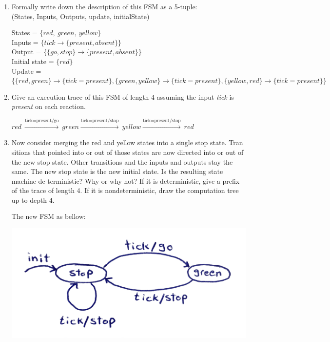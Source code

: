 \documentclass[12pt]{article}
\begin{document}
\begin{enumerate}
	\item Formally write down the description of this FSM as a 5-tuple:\\
	\centering(States, Inputs, Outputs, update, initialState)
	
	\begin{qsolve}[Solution]
		\raggedright States = $\{red,\ green,\ yellow\}$ \\
		Inputs = $\{ tick \rightarrow \{present, absent \} \}$ \\
		Output = $\{\{go, stop\} \rightarrow \{present, absent\} \}$ \\
		Initial state = $\{red\}$\\
		Update = $\{\{red,green\}\rightarrow \{tick=present\}, \{green,yellow\}\rightarrow \{tick=present\}, \{yellow,red\}\rightarrow \{tick=present\} \}$
	\end{qsolve}
	
	
	\item \raggedright Give an execution trace of this FSM of length 4 assuming the input \textit{tick} is
	\textit{present} on each reaction.
	\begin{qsolve}[Solution]
		$red \ \xrightarrow{\text{tick=present/go}} \ green \xrightarrow{\text{tick=present/stop}} \ yellow \xrightarrow{\text{tick=present/stop}} \ red$
	\end{qsolve}
	
	
	
	
	\item Now consider merging the red and yellow states into a single stop state. Tran
	sitions that pointed into or out of those states are now directed into or out of
	the new stop state. Other transitions and the inputs and outputs stay the same.
	The new stop state is the new initial state. Is the resulting state machine de
	terministic? Why or why not? If it is deterministic, give a prefix of the trace
	of length 4. If it is nondeterministic, draw the computation tree up to depth 4.
	\begin{qsolve}[Solution]
		The new FSM as bellow:
		
		
		\centering\includegraphics*[width=0.6\linewidth]{images/img8}
		

\end{qsolve}
\end{enumerate}
\end{document}
